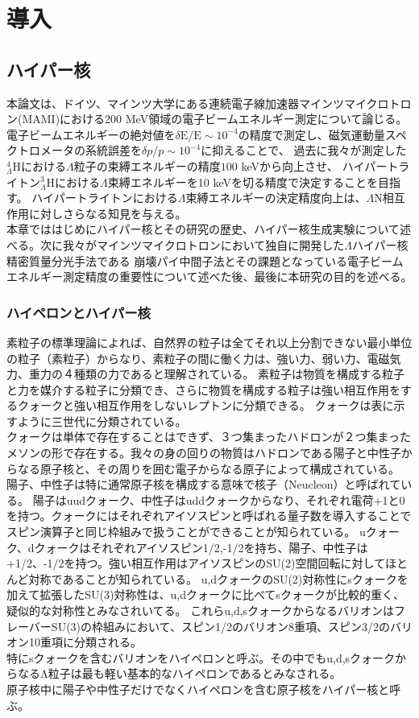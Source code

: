 \documentclass[a4paper,11pt,uplatex]{jsbook}
\begin{document}
\chapter{導入}
\section{ハイパー核}
本論文は、ドイツ、マインツ大学にある連続電子線加速器マインツマイクロトロン(MAMI)における200 MeV領域の電子ビームエネルギー測定について論じる。
電子ビームエネルギーの絶対値を$\delta \text{E}/\text{E} \sim 10^{-4}$の精度で測定し、磁気運動量スペクトロメータの系統誤差を$\delta p/p \sim 10^{-4}$に抑えることで、
過去に我々が測定した$^4_{\Lambda} \text{H}$における$\Lambda$粒子の束縛エネルギーの精度$100$ keVから向上させ、
ハイパートライトン$^3_{\Lambda}\text{H}$における$\Lambda$束縛エネルギーを10 keVを切る精度で決定することを目指す。
ハイパートライトンにおける$\Lambda$束縛エネルギーの決定精度向上は、$\Lambda$N相互作用に対しさらなる知見を与える。\\
本章でははじめにハイパー核とその研究の歴史、ハイパー核生成実験について述べる。次に我々がマインツマイクロトロンにおいて独自に開発した$\Lambda$ハイパー核精密質量分光手法である
崩壊パイ中間子法とその課題となっている電子ビームエネルギー測定精度の重要性について述べた後、最後に本研究の目的を述べる。

\subsection{ハイペロンとハイパー核}
素粒子の標準理論によれば、自然界の粒子は全てそれ以上分割できない最小単位の粒子（素粒子）からなり、素粒子の間に働く力は、強い力、弱い力、電磁気力、重力の４種類の力であると理解されている。
素粒子は物質を構成する粒子と力を媒介する粒子に分類でき、さらに物質を構成する粒子は強い相互作用をするクォークと強い相互作用をしないレプトンに分類できる。
クォークは表に示すように三世代に分類されている。\\
クォークは単体で存在することはできず、３つ集まったハドロンが２つ集まったメソンの形で存在する。我々の身の回りの物質はハドロンである陽子と中性子からなる原子核と、その周りを囲む電子からなる原子によって構成されている。
陽子、中性子は特に通常原子核を構成する意味で核子（Neucleon）と呼ばれている。
陽子はuudクォーク、中性子はuddクォークからなり、それぞれ電荷+1と0を持つ。クォークにはそれぞれアイソスピンと呼ばれる量子数を導入することでスピン演算子と同じ枠組みで扱うことができることが知られている。
uクォーク、dクォークはそれぞれアイソスピン1/2,-1/2を持ち、陽子、中性子は+1/2、-1/2を持つ。強い相互作用はアイソスピンのSU(2)空間回転に対してほとんど対称であることが知られている。
u,dクォークのSU(2)対称性にsクォークを加えて拡張したSU(3)対称性は、u,dクォークに比べてsクォークが比較的重く、疑似的な対称性とみなされいてる。
これらu,d,sクォークからなるバリオンはフレーバーSU(3)の枠組みにおいて、スピン1/2のバリオン8重項、スピン3/2のバリオン10重項に分類される。\\
特にsクォークを含むバリオンをハイペロンと呼ぶ。その中でもu,d,sクォークからなるΛ粒子は最も軽い基本的なハイペロンであるとみなされる。\\
原子核中に陽子や中性子だけでなくハイペロンを含む原子核をハイパー核と呼ぶ。
\end{document}
